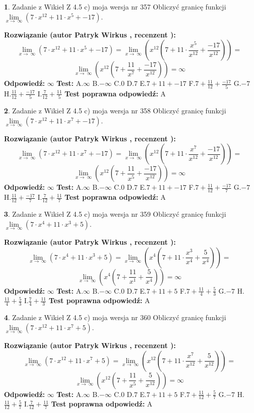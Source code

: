 \documentclass[12pt, a4paper]{article}
\theoremstyle{definition} %
\newtheorem{zad}{}
\newcommand{\zadStart}[1]{\begin{zad}#1\newline}
\newcommand{\zadStop}{\end{zad}}
\newcommand{\rozwStart}[2]{\noindent \textbf{Rozwiązanie (autor #1 , recenzent #2): }\newline}
\newcommand{\rozwStop}{\newline}
\newcommand{\odpStart}{\noindent \textbf{Odpowiedź:}\newline}
\newcommand{\odpStop}{\newline}
\newcommand{\testStart}{\noindent \textbf{Test:}\newline}
\newcommand{\testStop}{\newline}
\newcommand{\kluczStart}{\noindent \textbf{Test poprawna odpowiedź:}\newline}
\newcommand{\kluczStop}{\newline}
\begin{document}
\zadStart{Zadanie z Wikieł Z 4.5 c) moja wersja nr 357}
Obliczyć granicę funkcji  $\lim\limits_{x\to\ \infty}(7 \cdot x^{12}+11 \cdot x^{5}+-17)$.
\zadStop
\rozwStart{Patryk Wirkus}{}
$$\lim\limits_{x\to\ \infty}(7 \cdot x^{12}+11 \cdot x^{5}+-17) = \lim\limits_{x\to\ \infty}(x^{12}(7 +11 \cdot \frac{x^{5}}{x^{12}}+\frac{-17}{x^{12}})) =$$ $$\lim\limits_{x\to\ \infty}(x^{12}(7 +\frac{11}{x^{7}}+\frac{-17}{x^{12}})) =\infty$$
\rozwStop
\odpStart
$\infty$
\odpStop
\testStart
A.$\infty$ B.$-\infty$ C.$0$ D.$7$ E.$7 + 11 + -17$
F.$7+\frac{11}{12}+\frac{-17}{5}$ G.$-7$
H.$\frac{11}{12}+\frac{-17}{5}$
I.$\frac{7}{12}+\frac{11}{5}$
\testStop
\kluczStart
A
\kluczStop



\zadStart{Zadanie z Wikieł Z 4.5 c) moja wersja nr 358}
Obliczyć granicę funkcji  $\lim\limits_{x\to\ \infty}(7 \cdot x^{12}+11 \cdot x^{7}+-17)$.
\zadStop
\rozwStart{Patryk Wirkus}{}
$$\lim\limits_{x\to\ \infty}(7 \cdot x^{12}+11 \cdot x^{7}+-17) = \lim\limits_{x\to\ \infty}(x^{12}(7 +11 \cdot \frac{x^{7}}{x^{12}}+\frac{-17}{x^{12}})) =$$ $$\lim\limits_{x\to\ \infty}(x^{12}(7 +\frac{11}{x^{5}}+\frac{-17}{x^{12}})) =\infty$$
\rozwStop
\odpStart
$\infty$
\odpStop
\testStart
A.$\infty$ B.$-\infty$ C.$0$ D.$7$ E.$7 + 11 + -17$
F.$7+\frac{11}{12}+\frac{-17}{7}$ G.$-7$
H.$\frac{11}{12}+\frac{-17}{7}$
I.$\frac{7}{12}+\frac{11}{7}$
\testStop
\kluczStart
A
\kluczStop



\zadStart{Zadanie z Wikieł Z 4.5 c) moja wersja nr 359}
Obliczyć granicę funkcji  $\lim\limits_{x\to\ \infty}(7 \cdot x^{4}+11 \cdot x^{3}+5)$.
\zadStop
\rozwStart{Patryk Wirkus}{}
$$\lim\limits_{x\to\ \infty}(7 \cdot x^{4}+11 \cdot x^{3}+5) = \lim\limits_{x\to\ \infty}(x^{4}(7 +11 \cdot \frac{x^{3}}{x^{4}}+\frac{5}{x^{4}})) =$$ $$\lim\limits_{x\to\ \infty}(x^{4}(7 +\frac{11}{x^{1}}+\frac{5}{x^{4}})) =\infty$$
\rozwStop
\odpStart
$\infty$
\odpStop
\testStart
A.$\infty$ B.$-\infty$ C.$0$ D.$7$ E.$7 + 11 + 5$
F.$7+\frac{11}{4}+\frac{5}{3}$ G.$-7$
H.$\frac{11}{4}+\frac{5}{3}$
I.$\frac{7}{4}+\frac{11}{3}$
\testStop
\kluczStart
A
\kluczStop



\zadStart{Zadanie z Wikieł Z 4.5 c) moja wersja nr 360}
Obliczyć granicę funkcji  $\lim\limits_{x\to\ \infty}(7 \cdot x^{12}+11 \cdot x^{7}+5)$.
\zadStop
\rozwStart{Patryk Wirkus}{}
$$\lim\limits_{x\to\ \infty}(7 \cdot x^{12}+11 \cdot x^{7}+5) = \lim\limits_{x\to\ \infty}(x^{12}(7 +11 \cdot \frac{x^{7}}{x^{12}}+\frac{5}{x^{12}})) =$$ $$\lim\limits_{x\to\ \infty}(x^{12}(7 +\frac{11}{x^{5}}+\frac{5}{x^{12}})) =\infty$$
\rozwStop
\odpStart
$\infty$
\odpStop
\testStart
A.$\infty$ B.$-\infty$ C.$0$ D.$7$ E.$7 + 11 + 5$
F.$7+\frac{11}{12}+\frac{5}{7}$ G.$-7$
H.$\frac{11}{12}+\frac{5}{7}$
I.$\frac{7}{12}+\frac{11}{7}$
\testStop
\kluczStart
A
\kluczStop
\end{document}
